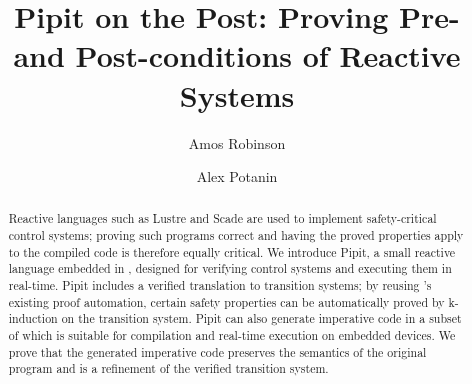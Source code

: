 \documentclass[a4paper,UKenglish,cleveref, autoref, thm-restate]{lipics-v2021}
\title{Pipit on the Post: Proving Pre- and Post-conditions of Reactive Systems}
\author{Amos Robinson}{Australian National University, Canberra, Australia}{amos.robinson@anu.edu.au}{https://orcid.org/0009-0004-4837-4981}{}
\author{Alex Potanin}{Australian National University, Canberra, Australia}{alex.potanin@anu.edu.au}{https://orcid.org/0000-0002-4242-2725}{}
\begin{document}
\maketitle

\begin{abstract}
  Reactive languages such as Lustre and Scade are used to implement safety-critical control systems; proving such programs correct and having the proved properties apply to the compiled code is therefore equally critical.
  We introduce Pipit, a small reactive language embedded in \fstar{}, designed for verifying control systems and executing them in real-time.
  Pipit includes a verified translation to transition systems; by reusing \fstar{}'s existing proof automation, certain safety properties can be automatically proved by k-induction on the transition system.
  Pipit can also generate imperative code in a subset of \fstar{} which is suitable for compilation and real-time execution on embedded devices.
  We prove that the generated imperative code preserves the semantics of the original program and is a refinement of the verified transition system.
\end{abstract}


\makeatactive
















\end{document}
